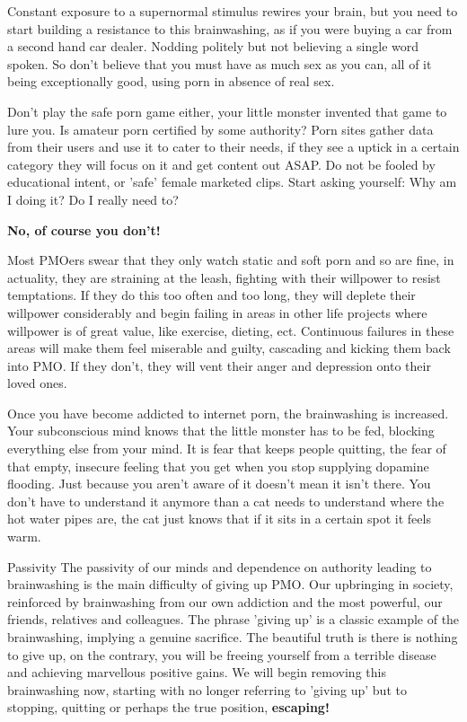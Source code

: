 Constant exposure to a supernormal stimulus rewires your brain, but you need to start building a resistance to this brainwashing, as if you were buying a car from a second hand car dealer. Nodding politely but not believing a single word spoken. So don't believe that you must have as much sex as you can, all of it being exceptionally good, using porn in absence of real sex.

Don't play the safe porn game either, your little monster invented that game to lure you. Is amateur porn certified by some authority? Porn sites gather data from their users and use it to cater to their needs, if they see a uptick in a certain category they will focus on it and get content out ASAP. Do not be fooled by educational intent, or 'safe' female marketed clips. Start asking yourself:
  Why am I doing it?
  Do I really need to?

\textbf{No, of course you don't!}

Most PMOers swear that they only watch static and soft porn and so are fine, in actuality, they are straining at the leash, fighting with their willpower to resist temptations. If they do this too often and too long, they will deplete their willpower considerably and begin failing in areas in other life projects where willpower is of great value, like exercise, dieting, ect. Continuous failures in these areas will make them feel miserable and guilty, cascading and kicking them back into PMO. If they don't, they will vent their anger and depression onto their loved ones.

Once you have become addicted to internet porn, the brainwashing is increased. Your subconscious mind knows that the little monster has to be fed, blocking everything else from your mind. It is fear that keeps people quitting, the fear of that empty, insecure feeling that you get when you stop supplying dopamine flooding. Just because you aren't aware of it doesn't mean it isn't there. You don't have to understand it anymore than a cat needs to understand where the hot water pipes are, the cat just knows that if it sits in a certain spot it feels warm.

Passivity
The passivity of our minds and dependence on authority leading to brainwashing is the main difficulty of giving up PMO. Our upbringing in society, reinforced by brainwashing from our own addiction and the most powerful, our friends, relatives and colleagues. The phrase 'giving up' is a classic example of the brainwashing, implying a genuine sacrifice. The beautiful truth is there is nothing to give up, on the contrary, you will be freeing yourself from a terrible disease and achieving marvellous positive gains. We will begin removing this brainwashing now, starting with no longer referring to 'giving up' but to stopping, quitting or perhaps the true position, \textbf{escaping!}

